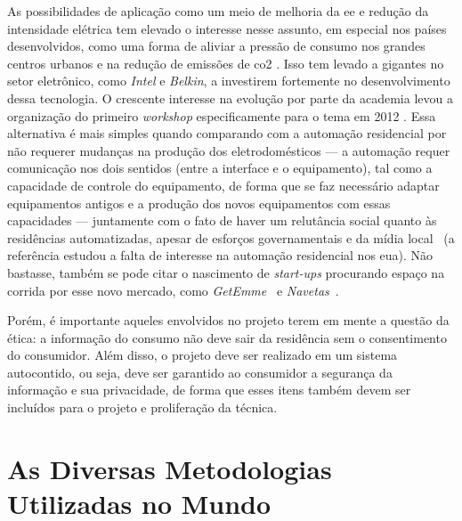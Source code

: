 As possibilidades de aplicação como um meio de melhoria da \gls{ee} e
redução da intensidade elétrica tem elevado o interesse nesse assunto,
em especial nos países desenvolvidos, como uma forma de aliviar
a pressão de consumo nos grandes centros urbanos e na redução de
emissões de \gls{co2} \cite{nilm_zeifman_review_2011}.
Isso tem levado a gigantes no setor eletrônico, como \emph{Intel} e
\emph{Belkin}, a investirem fortemente no desenvolvimento dessa
tecnologia. O crescente interesse na evolução por parte da academia
levou a organização do primeiro \emph{workshop} especificamente para o
tema em 2012 \cite{workshop_nilm}. Essa alternativa é mais simples
quando comparando com a automação residencial por não requerer
mudanças na produção dos eletrodomésticos --- a automação requer
comunicação nos dois sentidos (entre a interface e o equipamento), tal
como a capacidade de controle do equipamento, de forma que se faz
necessário adaptar equipamentos antigos e a produção dos novos
equipamentos com essas capacidades --- juntamente com o fato de haver
um relutância social quanto às residências automatizadas, apesar de
esforços governamentais e da mídia local~\cite{Lipoff_Automation_2010}
(a referência estudou a falta de interesse na automação residencial
nos \gls{eua}). Não bastasse, também se pode citar o nascimento de
\emph{start-ups} procurando espaço na corrida por esse novo mercado,
como \emph{GetEmme}~\cite{getemme_site} e \emph{Navetas}~\cite{navetas_site}.

Porém, é importante aqueles envolvidos no projeto terem em mente a
questão da ética: a informação do consumo não deve sair da residência
sem o consentimento do consumidor. Além disso, o projeto deve ser
realizado em um sistema autocontido, ou seja, deve ser garantido ao
consumidor a segurança da informação e sua privacidade, de forma que
esses itens também devem ser incluídos para o projeto e proliferação
da técnica.

\section{As Diversas Metodologias Utilizadas no Mundo}%
\label{sec:nilm_mundo}


